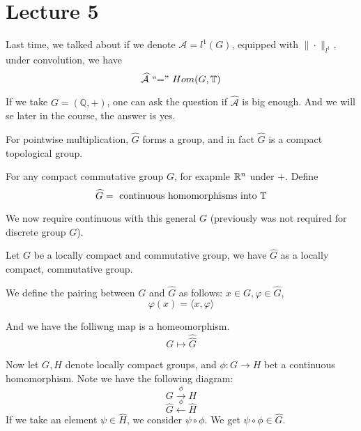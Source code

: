 \section{Lecture 5}
Last time, we talked about if we denote $\mathcal{A}=l^1(G)$, equipped with $\|\cdot\|_{l^1}$, under convolution, we have
\begin{equation*}
    \widehat{\mathcal{A}}\text{ ``='' } Hom(G,\mathbb{T})
\end{equation*}

If we take $G=(\mathbb{Q}, +)$, one can ask the question if $\widehat{\mathcal{A}}$ is big enough. And we will se later in the course, the answer is yes.

For pointwise multiplication, $\widehat{G}$ forms a group, and in fact $\widehat{G}$ is a compact topological group.

For any compact commutative group $G$, for exapmle $\mathbb{R}^n$ under $+$. Define
\begin{equation*}
    \widehat{G}=\text{ continuous homomorphisms into } \mathbb{T}
\end{equation*}
\begin{remark}
    We now require continuous with this general $G$ (previously was not required for discrete group $G$).
\end{remark}

\begin{proposition}
    Let $G$ be a locally compact and commutative group, we have $\widehat{G}$ as a locally compact, commutative group.
\end{proposition}

We define the pairing between $G$ and $\widehat{G}$ as follows: $x\in G, \varphi\in\widehat{G}$,
\begin{equation*}
    \varphi(x)=\langle x, \varphi \rangle
\end{equation*}

And we have the folliwng map is a homeomorphism.
\begin{equation*}
    G\mapsto \widehat{\widehat{G}}
\end{equation*}

Now let $G,H$ denote locally compact groups, and $\phi:G\to H$ bet a continuous homomorphism.
Note we have the following diagram:
\begin{equation*}
    G \xrightarrow{\phi} H
\end{equation*}
\begin{equation*}
    \widehat{G} \xleftarrow{\phi}\widehat{H}
\end{equation*}
If we take an element $\psi\in\widehat{H}$, we consider $\psi\circ\phi$. We get $\psi\circ\phi\in\widehat{G}$.

